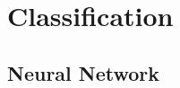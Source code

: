 \documentclass[12pt, a4paper, twoside]{report}
\begin{document}






















































































\chapter{Classification}
\section{Neural Network}
\end{document}
